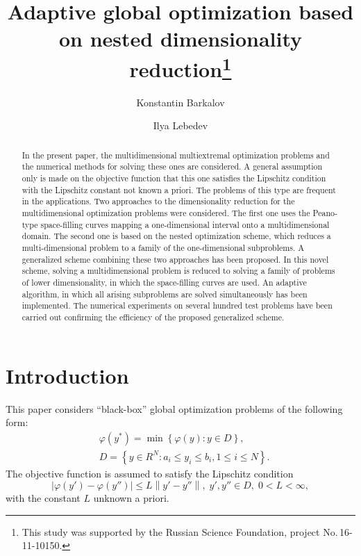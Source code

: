 \documentclass[runningheads]{llncs}
\begin{document}
%
\title{Adaptive global optimization based on nested dimensionality 
reduction\thanks{This study was supported by the Russian Science Foundation, 
project No.\,16-11-10150.}}
%
%
\author{Konstantin Barkalov %
\and Ilya Lebedev %
}
%
%
%
\maketitle              %
%
\begin{abstract}

In the present paper, the multidimensional multiextremal optimization 
problems and the numerical methods for solving these ones are considered. A 
general assumption only is made on the objective function that this one 
satisfies the Lipschitz condition with the Lipschitz constant not known 
a priori. The problems of this type are frequent in the applications. 
Two approaches to the dimensionality reduction for the multidimensional 
optimization problems were considered. The first one uses the Peano-type 
space-filling curves mapping a one-dimensional interval onto a multidimensional 
domain. The second one is based on the nested optimization scheme, which 
reduces a multi-dimensional problem to a family of the one-dimensional 
subproblems. A generalized scheme combining these two approaches has been 
proposed. In this novel scheme, solving a multidimensional problem is 
reduced to solving a family of problems of lower dimensionality, in 
which the space-filling curves are used. An adaptive algorithm, in which all 
arising subproblems are solved simultaneously has been implemented. The 
numerical experiments on several hundred test problems have been carried out 
confirming the efficiency of the proposed generalized scheme.

\end{abstract}
%
%
%
\section{Introduction}
This paper considers ``black-box'' global optimization problems of the 
following form:
\begin{eqnarray}\label{main_problem}
& \varphi(y^\ast)=\min{\left\{\varphi(y):y\in D\right\}},\\
& D=\left\{y\in R^N: a_i\leq y_i \leq b_i, 1\leq i \leq N\right\}. \nonumber
\end{eqnarray}
The objective function is assumed to satisfy the Lipschitz condition 
\[
\left|\varphi(y')-\varphi(y'')\right|\leq L\left\|y'-y''\right\|,\; y',y'' \in
 D,\; 0<L<\infty,
\]
with the constant $L$ unknown a priori.
\end{document}

